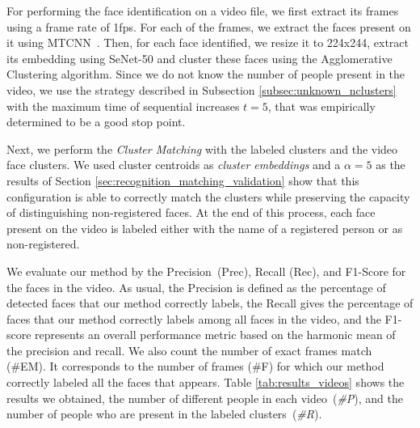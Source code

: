 For performing the face identification on a video file, we first extract its frames using a frame rate of 1fps. 
For each of the frames, we extract the faces present on it using MTCNN~\cite{mtcnn}. 
Then, for each face identified, we resize it to 224x244, extract its embedding using SeNet-50 and cluster these faces using the Agglomerative Clustering algorithm.
Since we do not know the number of people present in the video, we use the strategy described in Subsection \ref{subsec:unknown_nclusters} with the maximum time of sequential increases $t=5$, that was empirically determined to be a good stop point.

Next, we perform the \emph{Cluster Matching} with the labeled clusters and the video face clusters.
We used cluster centroids as \emph{cluster embeddings} and a $\alpha=5$ as the results of Section \ref{sec:recognition_matching_validation} show that this configuration is able to correctly match the clusters while preserving the capacity of distinguishing non-registered faces.
At the end of this process, each face present on the video is labeled either with the name of a registered person or as non-registered.

We evaluate our method by the Precision~(Prec), Recall (Rec), and F1-Score for the faces in the video. 
As usual, the Precision is defined as the percentage of detected faces that our method correctly labels, 
the Recall gives the percentage of faces that our method correctly labels among all faces in the video, and 
the F1-score represents an overall performance metric based on the  harmonic mean of the precision and recall.
We also count the number of exact frames match (\#EM). It corresponds to the number of frames (\#F) for which our method correctly labeled all the faces that appears. %
Table \ref{tab:results_videos} shows the results we obtained, the number of different people in each video~(\emph{\#P}), and the number of people who are present in the labeled clusters~(\emph{\#R}).

